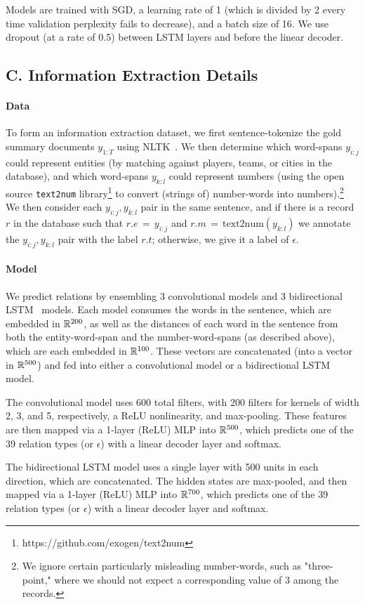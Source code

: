 \documentclass[11pt,letterpaper]{article}
\begin{document}
Models are trained with SGD, a learning rate of 1 (which is divided by 2 every time validation perplexity fails to decrease), and a batch size of 16. We use dropout (at a rate of 0.5) between LSTM layers and before the linear decoder.

\subsection*{C. Information Extraction Details}
\paragraph{Data} To form an information extraction dataset, we first sentence-tokenize the gold summary documents $y_{1:T}$ using NLTK~\cite{bird2006nltk}. We then determine which word-spans $y_{i:j}$ could represent entities (by matching against players, teams, or cities in the database), and which word-spans $y_{k:l}$ could represent numbers (using the open source \texttt{text2num} library\footnote{https://github.com/exogen/text2num} to convert (strings of) number-words into numbers).\footnote{We ignore certain particularly misleading number-words, such as "three-point," where we should not expect a corresponding value of 3 among the records.} We then consider each $y_{i:j}, y_{k:l}$ pair in the same sentence, and if there is a record $r$ in the database such that $r.e \, {=} \, y_{i:j}$ and $r.m \, {=} \, \mathrm{text2num}(y_{k:l})$ we annotate the $y_{i:j}, y_{k:l}$ pair with the label $r.t$; otherwise, we give it a label of $\epsilon$.

\paragraph{Model}
We predict relations by ensembling 3 convolutional models and 3 bidirectional LSTM~\cite{hochreiter1997lstm,graves2005framewise} models. 
Each model consumes the words in the sentence, which are embedded in $\mathbb{R}^{200}$, as well as the distances of each word in the sentence from both the entity-word-span and the number-word-spans (as described above), which are each embedded in $\mathbb{R}^{100}$. These vectors are concatenated (into a vector in $\mathbb{R}^{500}$) and fed into either a convolutional model or a bidirectional LSTM model. 

The convolutional model uses 600 total filters, with 200 filters for kernels of width 2, 3, and 5, respectively, a ReLU nonlinearity, and max-pooling. These features are then mapped via a 1-layer (ReLU) MLP into $\mathbb{R}^{500}$, which predicts one of the 39 relation types (or $\epsilon$) with a linear decoder layer and softmax. 

The bidirectional LSTM model uses a single layer with 500 units in each direction, which are concatenated. The hidden states are max-pooled, and then mapped via a 1-layer (ReLU) MLP into $\mathbb{R}^{700}$, which predicts one of the 39 relation types (or $\epsilon$) with a linear decoder layer and softmax.
\end{document}

